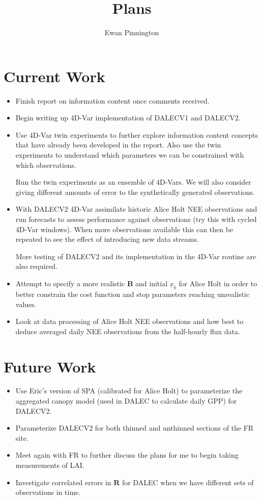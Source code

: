 \documentclass[11pt]{article}
\title{Plans}
\author{Ewan Pinnington}
\date
\begin{document}
\maketitle

\section*{Current Work}
\begin{itemize}
\item Finish report on information content once comments received.

\item Begin writing up 4D-Var implementation of DALECV1 and DALECV2.

\item Use 4D-Var twin experiments to further explore information content concepts that have already been developed in the report. Also use the twin experiments to understand which parameters we can be constrained with which observations.

Run the twin experiments as an ensemble of 4D-Vars. We will also consider giving different amounts of error to the synthetically generated observations. 

\item With DALECV2 4D-Var assimilate historic Alice Holt NEE observations and run forecasts to assess performance against observations (try this with cycled 4D-Var windows). When more observations available this can then be repeated to see the effect of introducing new data streams. 

More testing of DALECV2 and its implementation in the 4D-Var routine are also required.

\item Attempt to specify a more realistic $\textbf{B}$ and initial $\underline{x}_{b}$ for Alice Holt in order to better constrain the cost function and stop parameters reaching unrealistic values.

\item Look at data processing of Alice Holt NEE observations and how best to deduce averaged daily NEE observations from the half-hourly flux data.
\end{itemize}


\section*{Future Work}
\begin{itemize}
\item Use Eric's version of SPA (calibrated for Alice Holt) to parameterize the aggregated canopy model (used in DALEC to calculate daily GPP) for DALECV2.

\item Parameterize DALECV2 for both thinned and unthinned sections of the FR site.

\item Meet again with FR to further discuss the plans for me to begin taking measurements of LAI.

\item Investigate correlated errors in $\textbf{R}$ for DALEC when we have different sets of observations in time.
\end{itemize}
\end{document}
